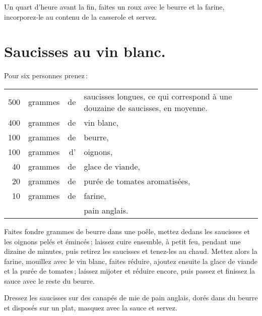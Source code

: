 Un quart d'heure avant la fin, faites un roux avec le beurre et la farine,
incorporez-le au contenu de la casserole et servez.

\section*{\centering Saucisses au vin blanc.}
{}

Pour six personnes prenez :

\medskip

\footnotesize
\begin{longtable}{rrrp{16em}}
    500 & grammes & de & saucisses longues, ce qui correspond à une douzaine de saucisses, en moyenne.    \\
    400 & grammes & de & vin blanc,                                                                       \\
    100 & grammes & de & beurre,                                                                          \\
    100 & grammes & d' & oignons,                                                                         \\
     40 & grammes & de & glace de viande,                                                                 \\
     20 & grammes & de & purée de tomates aromatisées,                                                    \\
     10 & grammes & de & farine,                                                                          \\
        &         &    & pain anglais.                                                                    \\
\end{longtable}
\normalsize

Faites fondre {\mmm} grammes de beurre dans une poêle, mettez dedans les saucisses
et les oignons pelés et émincés ; laissez cuire ensemble, à petit feu, pendant
une dizaine de minutes, puis retirez les saucisses et tenez-les au chaud.
Mettez alors la farine, mouillez avec le vin blanc, faites réduire, ajoutez
ensuite la glace de viande et la purée de tomates ; laissez mijoter et réduire
encore, puis passez et finissez la sauce avec le reste du beurre.

Dressez les saucisses sur des canapés de mie de pain anglais, dorés dans du
beurre et disposés sur un plat, masquez avec la sauce et servez.

